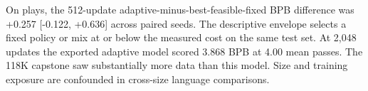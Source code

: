  On plays, the 512-update adaptive-minus-best-feasible-fixed BPB difference was +0.257 [-0.122, +0.636] across paired seeds. The descriptive envelope selects a fixed policy or mix at or below the measured cost on the same test set. At 2,048 updates the exported adaptive model scored 3.868 BPB at 4.00 mean passes. The 118K capstone saw substantially more data than this model. Size and training exposure are confounded in cross-size language comparisons.
